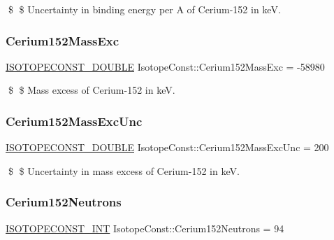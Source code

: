 \$ \$ Uncertainty in binding energy per A of Cerium-\/152 in keV. \mbox{\label{group___isotope_const-_cerium-_ce152_ga4cd1bf34443ce56754e8dd567d2f6b6c}} 
\subsubsection{\texorpdfstring{Cerium152\+Mass\+Exc}{Cerium152MassExc}}
{\footnotesize\ttfamily \mbox{\hyperlink{group___isotope_const-_macros_ga8f45a7272ce02c0b4c65c44636ed719a}{I\+S\+O\+T\+O\+P\+E\+C\+O\+N\+S\+T\+\_\+\+D\+O\+U\+B\+LE}} Isotope\+Const\+::\+Cerium152\+Mass\+Exc = -\/58980}

\$ \$ Mass excess of Cerium-\/152 in keV. \mbox{\label{group___isotope_const-_cerium-_ce152_ga3e8a21c7103a2a661f1b55b67bcbd245}} 
\subsubsection{\texorpdfstring{Cerium152\+Mass\+Exc\+Unc}{Cerium152MassExcUnc}}
{\footnotesize\ttfamily \mbox{\hyperlink{group___isotope_const-_macros_ga8f45a7272ce02c0b4c65c44636ed719a}{I\+S\+O\+T\+O\+P\+E\+C\+O\+N\+S\+T\+\_\+\+D\+O\+U\+B\+LE}} Isotope\+Const\+::\+Cerium152\+Mass\+Exc\+Unc = 200}

\$ \$ Uncertainty in mass excess of Cerium-\/152 in keV. \mbox{\label{group___isotope_const-_cerium-_ce152_gadaa6d29b34346c4f5bbf1a5eb7495832}} 
\subsubsection{\texorpdfstring{Cerium152\+Neutrons}{Cerium152Neutrons}}
{\footnotesize\ttfamily \mbox{\hyperlink{group___isotope_const-_macros_ga5f18360b3e99483a35c32d789e62621c}{I\+S\+O\+T\+O\+P\+E\+C\+O\+N\+S\+T\+\_\+\+I\+NT}} Isotope\+Const\+::\+Cerium152\+Neutrons = 94}

